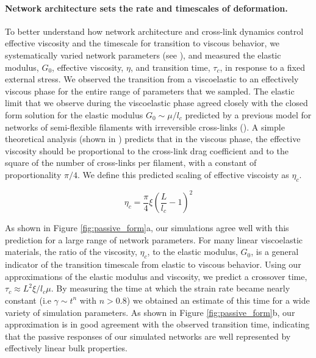 \documentclass[10pt,letterpaper]{article}
\begin{document}
\paragraph{Network architecture sets the rate and timescales of deformation.}  To better understand how network architecture and cross-link dynamics control effective viscosity and the timescale for transition to viscous behavior, we systematically varied network parameters (see ), and measured the elastic modulus, $G_0$, effective viscosity, $\eta$, and transition time, $\tau_c$, in response to a fixed external stress. We observed the transition from a viscoelastic to an effectively viscous phase for the entire range of parameters that we sampled.  The elastic limit that we observe during the viscoelastic phase agreed closely with the closed form solution for the elastic modulus  $G_0 \sim \mu/l_c$ predicted by a previous model \cite{theo_hlm} for networks of semi-flexible filaments with irreversible cross-links (). A simple theoretical analysis (shown in ) predicts that in the viscous phase, the effective viscosity should be proportional to the cross-link drag coefficient and to the square of the number of cross-links per filament, with a constant of proportionality $\pi/4$. We define this predicted scaling of effective viscoisty as $\eta_c$.

\begin{equation}
\eta_c = \frac{\pi}{4}\xi\left ( \frac{L}{l_c}-1\right )^2
\end{equation}


As shown in Figure \ref{fig:passive_form}a, our simulations agree well with this prediction for a large range of network parameters. For many linear viscoelastic materials, the ratio of the viscosity, $\eta_c$, to the elastic modulus, $G_0$, is a general indicator of the transition timescale from elastic to viscous behavior\cite{mccrum1997principles}. Using our approximations of the elastic modulus and viscosity, we predict a crossover time, $\tau_c \approx L^2\xi/l_c\mu$. By measuring the time at which the strain rate became nearly constant (i.e $\gamma \sim t^n$ with $n>0.8$) we obtained an estimate of this time for a wide variety of simulation parameters. As shown in Figure \ref{fig:passive_form}b, our approximation is in good agreement with the observed transition time, indicating that the passive responses of our simulated networks are well represented by effectively linear bulk properties.
\end{document}
